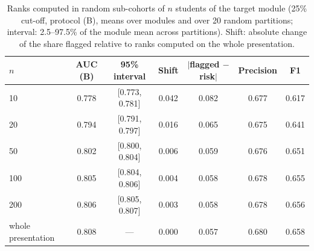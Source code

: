 \begin{table}[!ht]
\centering
\caption{Ranks computed in random sub-cohorts of $n$ students of the target module (25\% cut-off, protocol (B), means over modules and over 20 random partitions; interval: 2.5--97.5\% of the module mean across partitions). Shift: absolute change of the share flagged relative to ranks computed on the whole presentation.}
\label{tab:s-cohort}
\footnotesize
\begin{tabular}{@{}lcccccc@{}}
\toprule
$n$ & AUC (B) & 95\% interval & Shift & $|$flagged $-$ risk$|$ & Precision & F1 \\
\midrule
10 & 0.778 & [0.773, 0.781] & 0.042 & 0.082 & 0.677 & 0.617 \\
20 & 0.794 & [0.791, 0.797] & 0.016 & 0.065 & 0.675 & 0.641 \\
50 & 0.802 & [0.800, 0.804] & 0.006 & 0.059 & 0.676 & 0.651 \\
100 & 0.805 & [0.804, 0.806] & 0.004 & 0.058 & 0.678 & 0.655 \\
200 & 0.806 & [0.805, 0.807] & 0.003 & 0.058 & 0.678 & 0.656 \\
whole presentation & 0.808 & --- & 0.000 & 0.057 & 0.680 & 0.658 \\
\bottomrule
\end{tabular}
\end{table}

